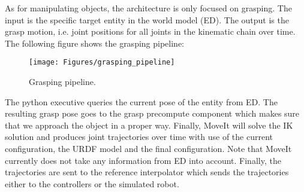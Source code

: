As for manipulating objects, the architecture is only focused on grasping. The input is the specific target entity in the world model (ED). The output is the grasp motion, i.e. joint positions for all joints in the kinematic chain over time. The following figure shows the grasping pipeline:
\begin{figure}[ht]
	\texttt{[image: Figures/grasping\_pipeline]}
	\caption{Grasping pipeline.}
	\label{fig:grasping_pipeline}
\end{figure}
The python executive queries the current pose of the entity from ED. The resulting grasp pose goes to the grasp precompute component which makes sure that we approach the object in a proper way. Finally, MoveIt will solve the IK solution and produces joint trajectories over time with use of the current configuration, the URDF model and the final configuration. Note that MoveIt currently does not take any information from ED into account. Finally, the trajectories are sent to the reference interpolator which sends the trajectories either to the controllers or the simulated robot. 